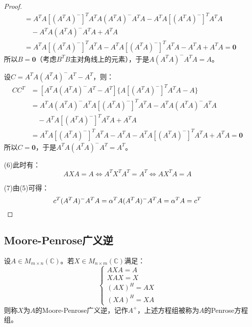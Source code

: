 \begin{proof}
\begin{align*}
		&=A^TA[(A^TA)^-]^TA^TA(A^TA)^-A^TA-A^TA[(A^TA)^-]^TA^TA \\
		&\quad-A^TA(A^TA)^-A^TA+A^TA \\
		&=A^TA[(A^TA)^-]^TA^TA-A^TA[(A^TA)^-]^TA^TA-A^TA+A^TA=\mathbf{0}
	\end{align*}
	所以$B=\mathbf{0}$（考虑$B^TB$主对角线上的元素），于是$A(A^TA)^-A^TA=A$。\par
	设$C=A^TA(A^TA)^-A^T-A^T$，则：
	\begin{align*}
		CC^T
		&=[A^TA(A^TA)^-A^T-A^T]\{A[(A^TA)^-]^TA^TA-A\} \\
		&=A^TA(A^TA)^-A^TA[(A^TA)^-]^TA^TA-A^TA(A^TA)^-A^TA \\
		&\quad-A^TA[(A^TA)^-]^TA^TA+A^TA \\
		&=A^TA[(A^TA)^-]^TA^TA-A^TA-A^TA[(A^TA)^-]^TA^TA+A^TA=\mathbf{0}
	\end{align*}
	所以$C=\mathbf{0}$，于是$A^TA(A^TA)^-A^T=A^T$。\par
	(6)此时有：
	\begin{equation*}
		AXA=A\Leftrightarrow A^TX^TA^T=A^T\Leftrightarrow AX^TA=A
	\end{equation*}\par
	(7)由(5)可得：
	\begin{equation*}
		c^T(A^TA)^-A^TA=\alpha^TA(A^TA)^-A^TA=\alpha^TA=c^T\qedhere
	\end{equation*}
\end{proof}

\subsection{Moore-Penrose广义逆}
\begin{definition}
	设$A\in M_{m\times n}(\mathbb{C})$。若$X\in M_{n\times m}(\mathbb{C})$满足：
	\begin{equation*}
		\begin{cases}
			AXA=A \\
			XAX=X \\
			(AX)^H=AX \\
			(XA)^H=XA
		\end{cases}
	\end{equation*}
	则称$X$为$A$的Moore-Penrose广义逆，记作$A^+$，上述方程组被称为$A$的Penrose方程组。
\end{definition}

